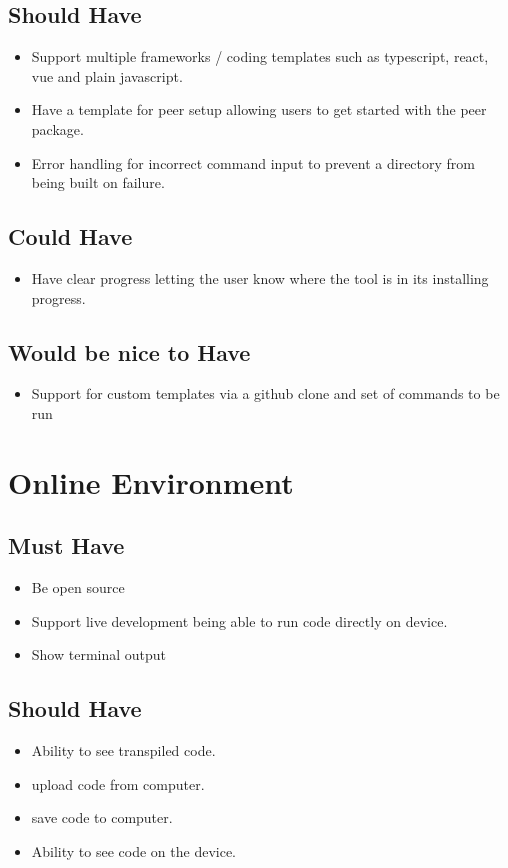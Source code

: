 \documentclass{l4proj}
\begin{document}
\begin{appendices}
\begin{itemize}
\end{itemize}
\subsection{Should Have}
\begin{itemize}
    \item Support multiple frameworks / coding templates such as typescript, react, vue and plain javascript.
    \item Have a template for peer setup allowing users to get started with the peer package.
    \item Error handling for incorrect command input to prevent a directory from being built on failure.

\end{itemize}
\subsection{Could Have}
\begin{itemize}
    \item Have clear progress letting the user know where the tool is in its installing progress.
\end{itemize}
\subsection{Would be nice to Have}
\begin{itemize}
    \item Support for custom templates via a github clone and set of commands to be run
\end{itemize}


\section{Online Environment}
\subsection{Must Have}
\begin{itemize}
    \item Be open source
    \item Support live development being able to run code directly on device.
    \item Show terminal output

\end{itemize}
\subsection{Should Have}
\begin{itemize}
    \item Ability to see transpiled code.
    \item upload code from computer.
    \item save code to computer.
    \item Ability to see code on the device.


\end{itemize}
\end{appendices}
\end{document}
